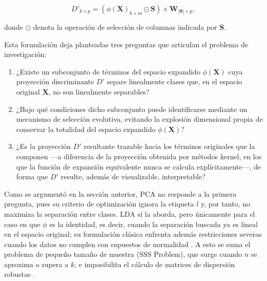 	\begin{equation}
		D'_{k \times p} = \left(\phi(\mathbf{X})_{k \times m} \odot \mathbf{S}\right) \times \mathbf{W}_{|\mathbf{S}| \times p},
	\end{equation}
	
	\noindent donde $\odot$ denota la operación de selección de columnas indicada por $\mathbf{S}$.
	
	Esta formulación deja planteadas tres preguntas que articulan el problema de investigación:
	
	\begin{enumerate}
		\item ¿Existe un subconjunto de términos del espacio expandido $\phi(\mathbf{X})$ cuya proyección discriminante $D'$ separe linealmente clases que, en el espacio original $\mathbf{X}$, no son linealmente separables?
		\item ¿Bajo qué condiciones dicho subconjunto puede identificarse mediante un mecanismo de selección evolutiva, evitando la explosión dimensional propia de conservar la totalidad del espacio expandido $\phi(\mathbf{X})$?
		\item ¿Es la proyección $D'$ resultante trazable hacia los términos originales que la componen —a diferencia de la proyección obtenida por métodos kernel, en los que la función de expansión equivalente nunca se calcula explícitamente—, de forma que $D'$ resulte, además de visualizable, interpretable?
	\end{enumerate}
	
	Como se argumentó en la sección anterior, PCA no responde a la primera pregunta, pues su criterio de optimización ignora la etiqueta $l$ y, por tanto, no maximiza la separación entre clases. LDA sí la aborda, pero únicamente para el caso en que $\phi$ es la identidad, es decir, cuando la separación buscada ya es lineal en el espacio original; su formulación clásica enfrenta además restricciones severas cuando los datos no cumplen con supuestos de normalidad \cite{feng2021comparison}. A esto se suma el problema de pequeño tamaño de muestra (SSS Problem), que surge cuando $n$ se aproxima o supera a $k$, e imposibilita el cálculo de matrices de dispersión robustas \cite{sharma2015linear}.
	
